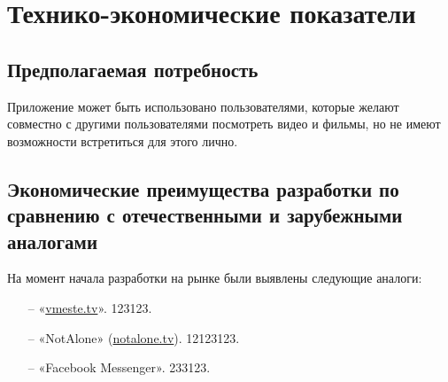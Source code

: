 \section{Технико-экономические показатели}

\subsection{Предполагаемая потребность}

Приложение может быть использовано пользователями, которые желают совместно с другими пользователями посмотреть видео и
фильмы, но не имеют возможности встретиться для этого лично.

\subsection{Экономические преимущества разработки по сравнению с отечественными и зарубежными аналогами}

На момент начала разработки на рынке были выявлены следующие аналоги:
\begin{itemize}
    \item[--] «\href{https://notalone.tv/}{vmeste.tv}».
    123123.
    \item[--] «NotAlone» (\href{https://notalone.tv/}{notalone.tv}).
    12123123.
    \item[--] «Facebook Messenger».
    233123.
\end{itemize}
